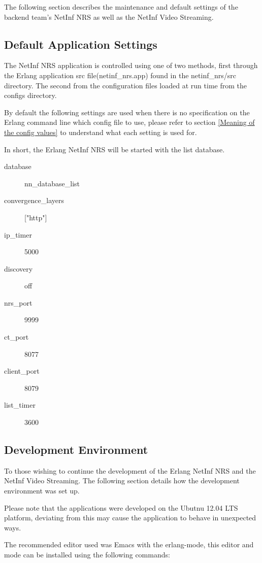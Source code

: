 The following section describes the maintenance and default settings of the backend team's NetInf NRS as well as the NetInf Video Streaming.

\subsection{Default Application Settings}

The NetInf NRS application is controlled using one of two methods, first through the Erlang application src file(netinf\_nrs.app) found in the netinf\_nrs/src directory. The second from the configuration files loaded at run time from the configs directory. 

By default the following settings are used when there is no specification on the Erlang command line which config file to use, please refer to section \ref{Meaning of the config values} to understand what each setting is used for. 

In short, the Erlang NetInf NRS will be started with the list database.

\begin{description}
\item[database]
nn\_database\_list
\item[convergence\_layers]
["http"]
\item[ip\_timer]
5000
\item[discovery]
off
\item[nrs\_port]
9999
\item[ct\_port]
8077
\item[client\_port]
8079
\item[list\_timer]
3600
\end{description}

\subsection {Development Environment}

To those wishing to continue the development of the Erlang NetInf NRS and the NetInf Video Streaming. The following section details how the development environment was set up. 

Please note that the applications were developed on the Ubutnu 12.04 LTS platform, deviating from this may cause the application to behave in unexpected ways.

The recommended editor used was Emacs with the erlang-mode, this editor and mode can be installed using the following commands:

